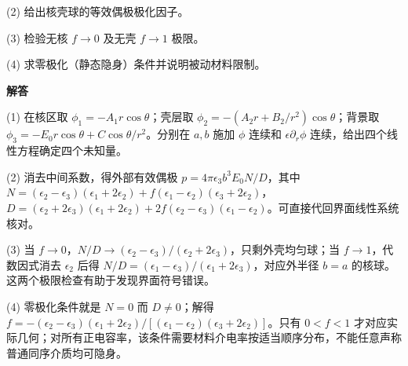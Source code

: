 (2) 给出核壳球的等效偶极极化因子。

(3) 检验无核 $f\to0$ 及无壳 $f\to1$ 极限。

(4) 求零极化（静态隐身）条件并说明被动材料限制。

\par\textbf{解答}

(1) 在核区取 $\phi_1=-A_1r\cos\theta$；壳层取 $\phi_2=-(A_2r+B_2/r^2)\cos\theta$；背景取 $\phi_3=-E_0r\cos\theta+C\cos\theta/r^2$。分别在 $a,b$ 施加 $\phi$ 连续和 $\epsilon\partial_r\phi$ 连续，给出四个线性方程确定四个未知量。

(2) 消去中间系数，得外部有效偶极 $p=4\pi\epsilon_3b^3 E_0N/D$，其中 $N=(\epsilon_2-\epsilon_3)(\epsilon_1+2\epsilon_2)+f(\epsilon_1-\epsilon_2)(\epsilon_3+2\epsilon_2)$，$D=(\epsilon_2+2\epsilon_3)(\epsilon_1+2\epsilon_2)+2f(\epsilon_2-\epsilon_3)(\epsilon_1-\epsilon_2)$。可直接代回界面线性系统核对。

(3) 当 $f\to0$，$N/D\to(\epsilon_2-\epsilon_3)/(\epsilon_2+2\epsilon_3)$，只剩外壳均匀球；当 $f\to1$，代数因式消去 $\epsilon_2$ 后得 $N/D=(\epsilon_1-\epsilon_3)/(\epsilon_1+2\epsilon_3)$，对应外半径 $b=a$ 的核球。这两个极限检查有助于发现界面符号错误。

(4) 零极化条件就是 $N=0$ 而 $D\ne0$；解得 $f=-(\epsilon_2-\epsilon_3)(\epsilon_1+2\epsilon_2)/[(\epsilon_1-\epsilon_2)(\epsilon_3+2\epsilon_2)]$。只有 $0<f<1$ 才对应实际几何；对所有正电容率，该条件需要材料介电率按适当顺序分布，不能任意声称普通同序介质均可隐身。

\par\medskip


